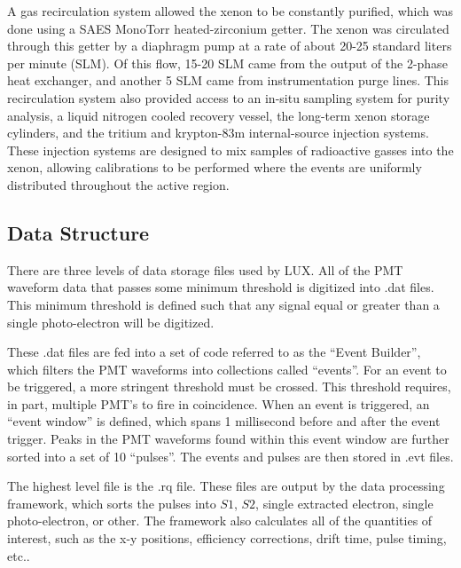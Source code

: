 A gas recirculation system allowed the xenon to be constantly purified, which was done using a SAES
MonoTorr heated-zirconium getter\cite{getter}. The xenon was circulated through this getter by a diaphragm pump at a rate of about 20-25 standard liters per minute (SLM). Of this flow, 15-20 SLM came from the output of the 2-phase heat exchanger, and another 5 SLM came from instrumentation purge lines. This recirculation system also provided access to an in-situ sampling system for purity analysis, a liquid nitrogen cooled recovery vessel, the long-term xenon storage cylinders, and the tritium\cite{lux_tritium} and krypton-83m\cite{lux_kr1} internal-source injection systems. These injection systems are designed to mix samples of radioactive gasses into the xenon, allowing calibrations to be performed where the events are uniformly distributed throughout the active region.

\subsection{Data Structure}
There are three levels of data storage files used by LUX. All of the PMT waveform data that passes some minimum threshold is digitized into .dat files. This minimum threshold is defined such that any signal equal or greater than a single photo-electron will be digitized. 

These .dat files are fed into a set of code referred to as the ``Event Builder'', which filters the PMT waveforms into collections called ``events''. For an event to be triggered, a more stringent threshold must be crossed. This threshold requires, in part, multiple PMT's to fire in coincidence. When an event is triggered, an ``event window'' is defined, which spans 1 millisecond  before and after the event trigger. Peaks in the PMT waveforms found within this event window are further sorted into a set of 10 ``pulses''. The events and pulses are then stored in .evt files.

The highest level file is the .rq file. These files are output by the data processing framework, which sorts the pulses into $S1$, $S2$, single extracted electron, single photo-electron, or other. The framework also calculates all of the quantities of interest, such as the x-y positions, efficiency corrections, drift time, pulse timing, etc..


